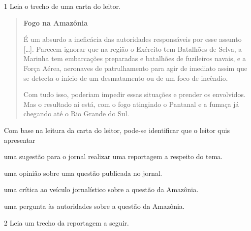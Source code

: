 
\num{1} Leia o trecho de uma carta do leitor.

\begin{quote}
\textbf{Fogo na Amazônia}

É um absurdo a ineficácia das autoridades responsáveis por esse assunto
{[}\ldots{}{]}. Parecem ignorar que na região o Exército tem Batalhões
de Selva, a Marinha tem embarcações preparadas e batalhões de fuzileiros
navais, e a Força Aérea, aeronaves de patrulhamento para agir de
imediato assim que se detecta o início de um desmatamento ou de um foco
de incêndio.

Com tudo isso, poderiam impedir essas situações e prender os envolvidos.
Mas o resultado aí está, com o fogo atingindo o Pantanal e a fumaça já
chegando até o Rio Grande do Sul.

\end{quote}

Com base na leitura da carta do leitor, pode-se identificar que o leitor
quis apresentar

\begin{escolha}
\item uma sugestão para o jornal realizar uma reportagem a respeito do tema.

\item uma opinião sobre uma questão publicada no jornal.

\item uma crítica ao veículo jornalístico sobre a questão da Amazônia.

\item uma pergunta às autoridades sobre a questão da Amazônia.
\end{escolha}

\num{2} Leia um trecho da reportagem a seguir.

